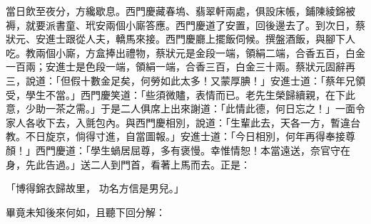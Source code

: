 當日飲至夜分，方纔歇息。西門慶藏春塢、翡翠軒兩處，俱設床帳，鋪陳綾錦被褥，就要派書童、玳安兩個小廝答應。西門慶道了安置，回後邊去了。到次日，蔡狀元、安進士跟從人夫，轎馬來接。西門慶廳上擺飯伺候。撰盤酒飯，與腳下人吃。教兩個小廝，方盒捧出禮物，蔡狀元是金段一端，領絹二端，合香五百，白金一百兩；安進士是色段一端，領絹一端，合香三百，白金三十兩。蔡狀元固辭再三，說道：「但假十數金足矣，何勞如此太多！又蒙厚腆！」安進士道：「蔡年兄領受，學生不當。」西門慶笑道：「些須微贐，表情而已。老先生榮歸續親，在下此意，少助一茶之需。」于是二人俱席上出來謝道：「此情此德，何日忘之！」一面令家人各收下去，入氈包內。與西門慶相別，說道：「生輩此去，天各一方，暫違台教。不日旋京，倘得寸進，自當圖報。」安進士道：「今日相別，何年再得奉接尊顏！」西門慶道：「學生蝸居屈尊，多有褒慢。幸惟情恕！本當遠送，奈官守在身，先此告過。」送二人到門首，看著上馬而去。正是：

「博得錦衣歸故里，  功名方信是男兒。」

畢竟未知後來何如，且聽下回分解：

